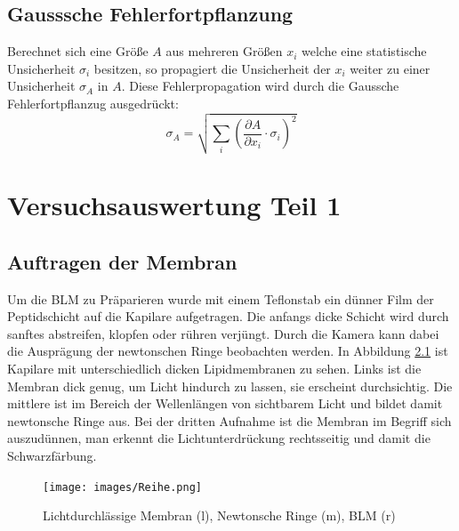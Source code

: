 \documentclass{include/thesisclass3}
\newcommand{\cc}{\cdot}
\newcommand{\p}{\partial}
\begin{document}
\section{Gausssche Fehlerfortpflanzung}
Berechnet sich eine Größe $A$ aus mehreren Größen $x_i$ welche eine statistische Unsicherheit $\sigma_i$ besitzen, so propagiert die Unsicherheit der $x_i$ weiter zu einer Unsicherheit $\sigma_A$ in $A$. Diese Fehlerpropagation wird durch die Gaussche Fehlerfortpflanzug ausgedrückt:
\begin{equation}
\sigma_A = \sqrt{\sum_i \left( \frac{\p A}{\p x_i} \cc \sigma_i \right)^2 }
\label{gauss}
\end{equation}



\chapter{Versuchsauswertung Teil 1}
\section{Auftragen der Membran}
Um die BLM zu Präparieren wurde mit einem Teflonstab ein dünner Film der Peptidschicht auf die Kapilare aufgetragen. Die anfangs dicke Schicht wird durch sanftes abstreifen, klopfen oder rühren verjüngt. Durch die Kamera kann dabei die Ausprägung der newtonschen Ringe beobachten werden. In Abbildung \ref{Reihe} ist Kapilare mit unterschiedlich dicken Lipidmembranen zu sehen. Links ist die Membran dick genug, um Licht hindurch zu lassen, sie erscheint durchsichtig. Die mittlere ist im Bereich der Wellenlängen von sichtbarem Licht und bildet damit newtonsche Ringe aus. Bei der dritten Aufnahme ist die Membran im Begriff sich auszudünnen, man erkennt die Lichtunterdrückung rechtsseitig und damit die Schwarzfärbung.
\begin{figure}[H]
	\begin{center}
		\texttt{[image: images/Reihe.png]}
		\caption{Lichtdurchlässige Membran (l), Newtonsche Ringe (m), BLM (r)}
		\label{Reihe}
	\end{center}
\end{figure}
\end{document}
